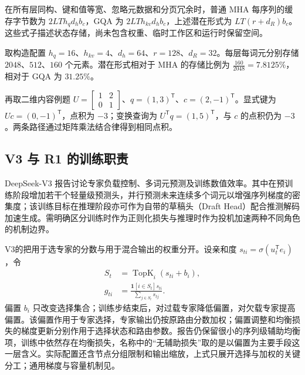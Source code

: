 \documentclass[../textbook.tex]{subfiles}
\begin{document}
\begin{example}[缓存压缩率]
在所有层同构、键和值等宽、忽略元数据和分页冗余时，普通 MHA 每序列的缓存字节数为 $2LT h_qd_hb_c$，GQA 为 $2LT h_{kv}d_hb_c$，上述潜在形式为 $LT(r+d_R)b_c$。这些式子描述状态存储，尚未包含权重、临时工作区和运行时保留空间。

取构造配置 $h_q=16$、$h_{kv}=4$、$d_h=64$、$r=128$、$d_R=32$。每层每词元分别存储 $2048$、$512$、$160$ 个元素。潜在形式相对于 MHA 的存储比例为 $\frac{160}{2048}=7.8125\%$，相对于 GQA 为 $31.25\%$。

再取二维内容例题 $U=\begin{bmatrix}1&2\\0&1\end{bmatrix}$、$q=(1,3)^{\mathsf T}$、$c=(2,-1)^{\mathsf T}$。显式键为 $Uc=(0,-1)^{\mathsf T}$，点积为 $-3$；变换查询为 $U^{\mathsf T}q=(1,5)^{\mathsf T}$，与 $c$ 的点积仍为 $-3$。两条路径通过矩阵乘法结合律得到相同点积。
\end{example}

\subsection{V3 与 R1 的训练职责}
DeepSeek-V3 报告讨论专家负载控制、多词元预测及训练数值效率\cite{deepseek2024v3}。其中在预训练阶段增加若干个轻量级预测头，并行预测未来连续多个词元以增强序列梯度的密集度；该训练目标在推理阶段亦可作为自带的草稿头（Draft Head）配合推测解码加速生成。需明确区分训练时作为正则化损失与推理时作为投机加速两种不同角色的机制边界。

V3的把用于选专家的分数与用于混合输出的权重分开。设亲和度 $s_{ti}=\sigma(u_t^{\mathsf T}e_i)$，令
\begin{equation}\label{eq:open-v3-routing}
 \begin{aligned}
  S_t &= \operatorname{TopK}_i(s_{ti}+b_i), \\
  g_{ti} &= \frac{\mathbf1[i\in S_t]s_{ti}}{\sum_{j\in S_t}s_{tj}}.
 \end{aligned}
\end{equation}
偏置 $b_i$ 只改变选择集合；训练步结束后，对过载专家降低偏置，对欠载专家提高偏置。该偏置作用于专家选择，专家输出仍按原路由分数加权；偏置调整和均衡损失的梯度更新分别作用于选择状态和路由参数。报告仍保留很小的序列级辅助均衡项，训练中依然存在均衡损失，名称中的“无辅助损失”取的是以偏置为主要手段这一层含义\cite{deepseek2024v3}。实际配置还含节点分组限制和输出缩放，上式只展开选择与加权的关键分工；通用梯度与容量机制见。
\end{document}
